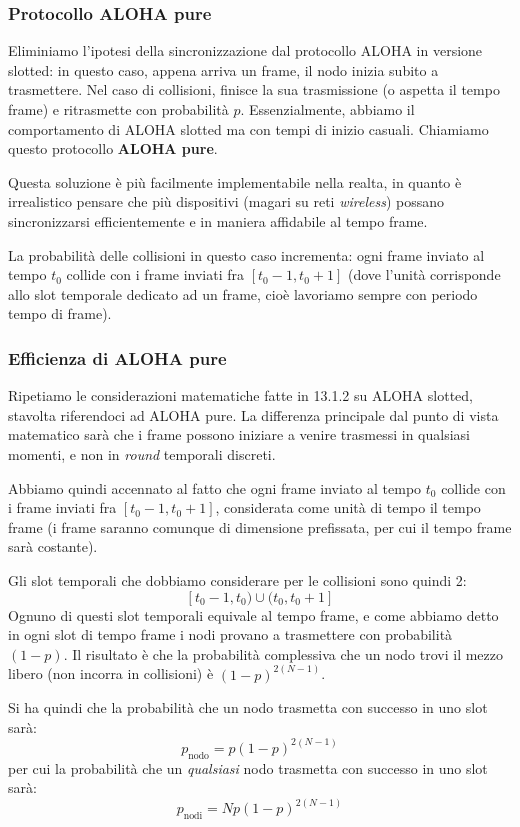 \documentclass[a4paper,11pt]{article}
\begin{document}
\subsubsection{Protocollo ALOHA pure}
Eliminiamo l'ipotesi della sincronizzazione dal protocollo ALOHA in versione slotted: in questo caso, appena arriva un frame, il nodo inizia subito a trasmettere. Nel caso di collisioni, finisce la sua trasmissione (o aspetta il tempo frame) e ritrasmette con probabilità $p$. Essenzialmente, abbiamo il comportamento di ALOHA slotted ma con tempi di inizio casuali.
Chiamiamo questo protocollo \textbf{ALOHA pure}.

Questa soluzione è più facilmente implementabile nella realta, in quanto è irrealistico pensare che più dispositivi (magari su reti \textit{wireless}) possano sincronizzarsi efficientemente e in maniera affidabile al tempo frame.

La probabilità delle collisioni in questo caso incrementa: ogni frame inviato al tempo $t_0$ collide con i frame inviati fra $[t_0 - 1, t_0 + 1]$ (dove l'unità corrisponde allo slot temporale dedicato ad un frame, cioè lavoriamo sempre con periodo tempo di frame).

\subsubsection{Efficienza di ALOHA pure}
Ripetiamo le considerazioni matematiche fatte in 13.1.2 su ALOHA slotted, stavolta riferendoci ad ALOHA pure.
La differenza principale dal punto di vista matematico sarà che i frame possono iniziare a venire trasmessi in qualsiasi momenti, e non in \textit{round} temporali discreti.

Abbiamo quindi accennato al fatto che ogni frame inviato al tempo $t_0$ collide con i frame inviati fra $[t_0 - 1, t_0 + 1]$, considerata come unità di tempo il tempo frame (i frame saranno comunque di dimensione prefissata, per cui il tempo frame sarà costante).

Gli slot temporali che dobbiamo considerare per le collisioni sono quindi 2:
$$
[t_0 - 1, t_0) \cup (t_0, t_0 + 1]
$$
Ognuno di questi slot temporali equivale al tempo frame, e come abbiamo detto in ogni slot di tempo frame i nodi provano a trasmettere con probabilità $(1 - p)$.
Il risultato è che la probabilità complessiva che un nodo trovi il mezzo libero (non incorra in collisioni) è $(1 - p)^{2(N - 1)}$.

Si ha quindi che la probabilità che un nodo trasmetta con successo in uno slot sarà:
$$
p_\text{nodo} = p (1 - p)^{2(N - 1)}
$$
per cui la probabilità che un \textit{qualsiasi} nodo trasmetta con successo in uno slot sarà:
$$
p_\text{nodi} = N p (1 - p)^{2(N - 1)}
$$
\end{document}
